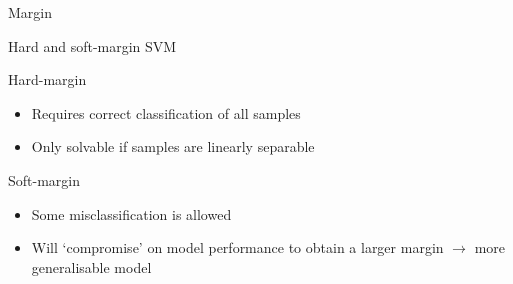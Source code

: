 \begin{frame}{Margin}
\end{frame}

\begin{frame}{Hard and soft\hyp{}margin SVM}
    \begin{block}{Hard\hyp{}margin}
        \begin{itemize}
            \item Requires correct classification of \alert{all} samples
            \item Only solvable if samples are linearly separable
        \end{itemize}
    \end{block}
    \vfill\pause
    \begin{block}{Soft\hyp{}margin}
        \begin{itemize}
            \item \alert{Some} misclassification is allowed
            \item Will `compromise' on model performance to obtain a larger
                  margin $\rightarrow$ more generalisable model
        \end{itemize}
    \end{block}
\end{frame}

